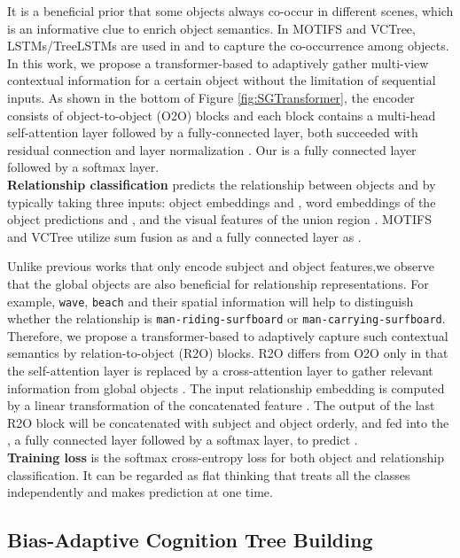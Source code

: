\documentclass[letterpaper]{article} \usepackage{aaai21}  \usepackage{times}  \usepackage{helvet} \usepackage{courier}  \usepackage[hyphens]{url}  \usepackage{graphicx} \urlstyle{rm} \def\UrlFont{\rm}  \usepackage{natbib}  \usepackage{caption} \frenchspacing  \setlength{\pdfpagewidth}{8.5in}  \setlength{\pdfpageheight}{11in}  \usepackage{amsmath,amsthm}
\begin{document}
It is a beneficial prior that some objects always co-occur in different scenes, which is an informative clue to enrich object semantics. In MOTIFS and VCTree, LSTMs/TreeLSTMs are used in  and  to capture the  co-occurrence among objects. In this work, we propose a transformer-based  to adaptively gather multi-view contextual information for a certain object without the limitation of sequential inputs. As shown in the bottom of Figure \ref{fig:SGTransformer}, the encoder consists of  object-to-object (O2O) blocks 
and each block contains a multi-head self-attention layer followed  by  a  fully-connected  layer,  both  succeeded with residual connection and layer normalization \cite{vaswani2017attention}. Our  is a fully connected layer followed by a softmax layer. \\
\textbf{Relationship classification} predicts the relationship  between objects  and   by typically taking three inputs: object embeddings  and , word embeddings of the object predictions  and , and the visual features of the union region . MOTIFS and VCTree utilize sum fusion as  and a fully connected layer as .

Unlike previous works that only encode subject and object features,we observe that the global objects are also beneficial for relationship representations. For example,  \texttt{wave}, \texttt{beach} and their spatial information will help to distinguish whether the relationship is \texttt{man-riding-surfboard} or \texttt{man}\texttt{-carrying}\texttt{-surfboard}. Therefore, we propose a transformer-based  to adaptively capture such contextual semantics by  relation-to-object (R2O) blocks. R2O  differs from O2O only in that the self-attention layer is replaced by a cross-attention layer to gather relevant information from global objects . The input relationship embedding  is computed by a linear transformation of the concatenated feature . The output of the last R2O block will be concatenated with subject  and object  orderly, and fed into the , a fully connected layer followed by a softmax layer, to predict .
\\
\textbf{Training loss} is the softmax cross-entropy loss \cite{zellers2018neural} for both object and relationship classification. It can be regarded as  flat thinking that treats all the classes independently and makes prediction at one time. 

\subsection{Bias-Adaptive Cognition Tree Building}
\label{ssec: buildTree}
\end{document}
